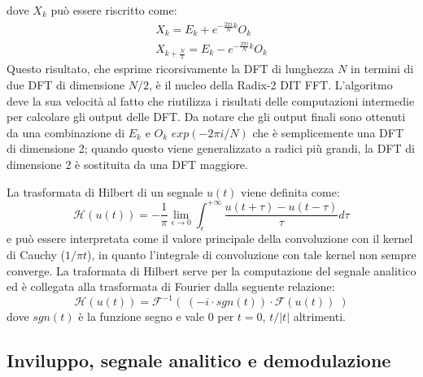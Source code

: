 \documentclass[a4paper, 12pt]{book}
\begin{document}
dove $X_k$ può essere riscritto come:
\begin{align}
	X_k = E_k+ e^{-\frac{2 \pi i}{N}k}O_k \\
	X_{k+\frac{N}{2}} = E_k -e^{-\frac{2 \pi i}{N}k}O_k
\end{align}
Questo risultato, che esprime ricorsivamente la DFT di lunghezza $N$ in termini di due DFT di dimensione $N/2$, è il nucleo della Radix-2 DIT FFT. L’algoritmo deve la sua velocità al fatto che riutilizza i risultati delle computazioni intermedie per calcolare gli output delle DFT.
Da notare che gli output finali sono ottenuti da una combinazione di $E_k$ e $O_k$ $exp(-2 \pi i /N)$ che è semplicemente una DFT di dimensione 2; quando questo viene generalizzato a radici più grandi, la DFT di dimensione 2 è sostituita da una DFT maggiore.
\newline

La trasformata di Hilbert di un segnale $u(t)$ viene definita come:
\begin{equation}
	\mathcal{H}(u(t)) = - \frac{1}{\pi} \lim_{\epsilon \to 0}\int_{\epsilon}^{+\infty} 			\frac{u(t+\tau)-u(t-\tau)}{\tau} d\tau
\end{equation}
e può essere interpretata come il valore principale della convoluzione con il kernel di Cauchy ($1/\pi t$), in quanto l'integrale di convoluzione con tale kernel non sempre converge.
La traformata di Hilbert serve per la computazione del segnale analitico ed è collegata alla trasformata di Fourier dalla seguente relazione:
\begin{equation}
	\mathcal{H}(u(t)) = \mathcal{F}^{-1}(\;(-i \cdot sgn(t)) \cdot \mathcal{F}(u(t))\;)
\end{equation}
dove $sgn(t)$ è la funzione segno e vale 0 per $t=0$, $t/|t|$ altrimenti.



\subsection{Inviluppo, segnale analitico e demodulazione}
\end{document}
